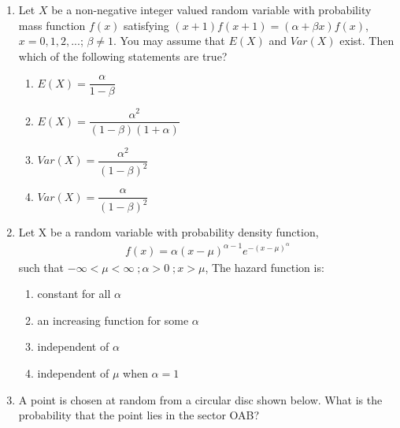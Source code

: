 \renewcommand{\theequation}{\theenumi}
\renewcommand{\thefigure}{\theenumi}
\renewcommand{\thetable}{\theenumi}
\begin{enumerate}[label=\thesection.\arabic*.,ref=\thesection.\theenumi]
%
\item Let $X$ be a non-negative integer valued random variable with probability mass function $f(x)$ satisfying $(x+1)f(x+1)=(\alpha + \beta x)f(x)$, $x=0,1,2,...$; $\beta \neq 1$. You may assume that $E(X)$ and $Var(X)$ exist. Then which of the following statements are true?

\begin{enumerate}
    \item $E(X)=\dfrac{\alpha}{1-\beta}$ \vspace{0.2cm}
    \item $E(X)=\dfrac{\alpha^2}{(1-\beta)(1+\alpha)}$ \vspace{0.2cm}
    \item $Var(X)=\dfrac{\alpha^2}{(1-\beta)^2}$ \vspace{0.2cm}
    \item $Var(X)=\dfrac{\alpha}{(1-\beta)^2}$
\end{enumerate}
%
\solution

%
\item Let X be a random variable with probability density function,
\begin{align}
    f(x)=\alpha(x-\mu)^{\alpha-1}e^{-(x-\mu)^{\alpha}}
\end{align}
such that $-\infty<\mu<\infty\;;\alpha>0\;;x>\mu$, The hazard function is: 
\begin{enumerate}
    \item constant for all $\alpha$
    \item an increasing function for some $\alpha$
    \item independent of $\alpha$
    \item independent of $\mu$ when $\alpha=1$
\end{enumerate}
%
\solution

%
\item 
A point is chosen at random from a circular disc shown below. What is the probability that the point lies in the sector OAB?\\

\\


\end{enumerate}
